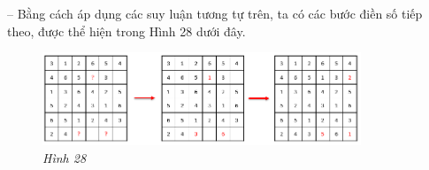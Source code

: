 	-- Bằng cách áp dụng các suy luận tương tự trên, ta có các bước điền số tiếp theo, được thể hiện trong Hình 28 dưới đây.
	\begin{figure}[H]
		\centering
		\vspace*{-10pt}
		\captionsetup{labelformat= empty, justification=centering}
		\includegraphics[width=0.85\textwidth]{pic17}
		\vspace*{-5pt}
		\caption{\small\textit{Hình 28}}
		\vspace*{-5pt}
	\end{figure}

